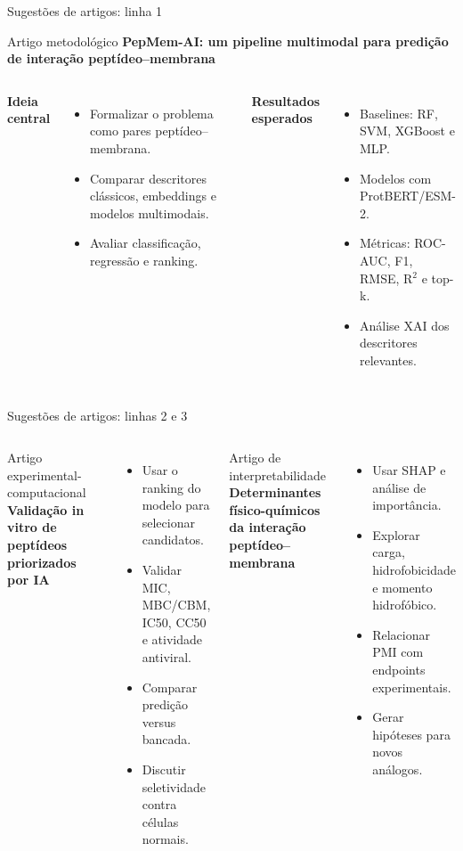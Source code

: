 \documentclass[aspectratio=169,10pt]{beamer}
\begin{document}
\begin{frame}{Sugestões de artigos: linha 1}
\begin{block}{Artigo metodológico}
\textbf{PepMem-AI: um pipeline multimodal para predição de interação peptídeo--membrana}
\end{block}
\begin{columns}[T]
\textbf{Ideia central}
\begin{itemize}
  \item Formalizar o problema como pares peptídeo--membrana.
  \item Comparar descritores clássicos, embeddings e modelos multimodais.
  \item Avaliar classificação, regressão e ranking.
\end{itemize}
\textbf{Resultados esperados}
\begin{itemize}
  \item Baselines: RF, SVM, XGBoost e MLP.
  \item Modelos com ProtBERT/ESM-2.
  \item Métricas: ROC-AUC, F1, RMSE, R$^2$ e top-k.
  \item Análise XAI dos descritores relevantes.
\end{itemize}
\end{columns}
\end{frame}

\begin{frame}{Sugestões de artigos: linhas 2 e 3}
\begin{columns}[T]
\begin{block}{Artigo experimental-computacional}
\textbf{Validação in vitro de peptídeos priorizados por IA}
\end{block}
\begin{itemize}
  \item Usar o ranking do modelo para selecionar candidatos.
  \item Validar MIC, MBC/CBM, IC50, CC50 e atividade antiviral.
  \item Comparar predição versus bancada.
  \item Discutir seletividade contra células normais.
\end{itemize}
\begin{block}{Artigo de interpretabilidade}
\textbf{Determinantes físico-químicos da interação peptídeo--membrana}
\end{block}
\begin{itemize}
  \item Usar SHAP e análise de importância.
  \item Explorar carga, hidrofobicidade e momento hidrofóbico.
  \item Relacionar PMI com endpoints experimentais.
  \item Gerar hipóteses para novos análogos.
\end{itemize}
\end{columns}
\end{frame}
\end{document}
